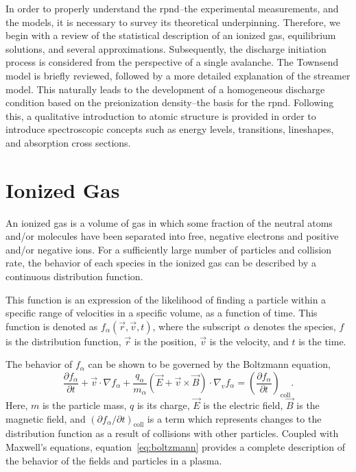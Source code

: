In order to properly understand the \acs{rpnd}--the experimental measurements,
and the models, it is necessary to survey its theoretical underpinning. 
Therefore, we begin with a review of the statistical description of an ionized
gas, equilibrium solutions, and several approximations. Subsequently, the
discharge initiation process is considered from the perspective of a single
avalanche. The Townsend model is briefly reviewed, followed by a more detailed
explanation of the streamer model. This naturally leads to the development of a
homogeneous discharge condition based on the preionization density--the basis
for the \acs{rpnd}. Following this, a qualitative introduction to atomic
structure is provided in order to introduce spectroscopic concepts such as
energy levels, transitions, lineshapes, and absorption cross sections.

\section{Ionized Gas}

An ionized gas is a volume of gas in which some fraction of the neutral atoms
and/or molecules have been separated into free, negative electrons and positive
and/or negative ions. For a sufficiently large number of particles and collision
rate, the behavior of each species in the ionized gas can be described by a
continuous distribution function.

This function is an expression of the likelihood of finding a particle within a
specific range of velocities in a specific volume, as a function of time. This
function is denoted as $f_\alpha(\vec{r}, \vec{v}, t)$, where the subscript
$\alpha$ denotes the species, $f$ is the distribution function, $\vec{r}$ is the
position, $\vec{v}$ is the velocity, and $t$ is the time.

The behavior of $f_\alpha$ can be shown \cite{Bellan2008} to be governed by the
Boltzmann equation,
\begin{equation}\label{eq:boltzmann}
  \frac{\partial f_\alpha}{\partial t} + \vec{v}\cdot\nabla f_\alpha +
  \frac{q_\alpha}{m_\alpha} \left(\vec{E} + \vec{v}\times\vec{B}\right)
  \cdot \nabla_v f_\alpha = \left( \frac{\partial f_\alpha}
  {\partial t}\right)_\mathrm{coll}.
\end{equation}
Here, $m$ is the particle mass, $q$ is its charge, $\vec{E}$ is the electric
field, $\vec{B}$ is the magnetic field, and $(\partial f_\alpha/\partial
t)_\mathrm{coll}$ is a term which represents changes to the distribution
function as a result of collisions with other particles. Coupled with Maxwell's
equations, equation~\ref{eq:boltzmann} provides a complete description of the
behavior of the fields and particles in a plasma.

